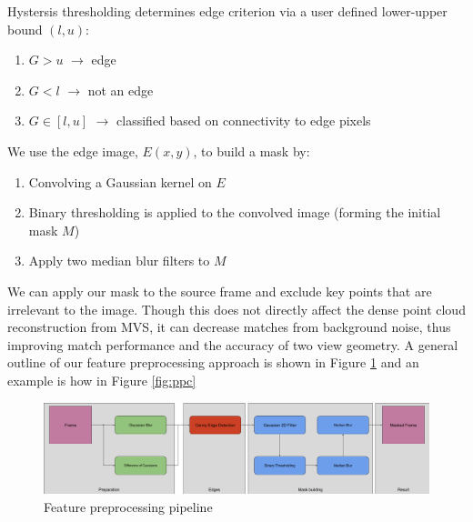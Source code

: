 \documentclass[conference,compsoc]{IEEEtran}
\begin{document}
Hystersis thresholding determines edge criterion via a user defined 
lower-upper bound $(l,u)$:
\begin{enumerate}[i]
    \item $G > u$ $\to$ edge
    \item $G < l$ $\to$ not an edge
    \item $G \in [l,u]$ $\to$ classified based on connectivity to edge pixels
\end{enumerate}
We use the edge image, $E(x,y)$, to build a mask by:
\begin{enumerate}[1.]
    \item Convolving a Gaussian kernel on $E$
    \item Binary thresholding is applied to the convolved image (forming the initial mask $M$)
    \item Apply two median blur filters to $M$
\end{enumerate}
We can apply our mask to the source frame and exclude key points that
are irrelevant to the image. Though this does not directly affect the dense point cloud
reconstruction from MVS, it can decrease matches from background noise, thus 
improving match performance and the accuracy of two view geometry. A general 
outline of our feature preprocessing approach is shown in Figure \ref{fig:ppc_pipe}
and an example is how in Figure \ref{fig:ppc}
\begin{figure}[ht!]
    \centering
    \includegraphics[width=.4\textwidth]{figures/preproc pipeline.png}
    \caption{Feature preprocessing pipeline}
    \label{fig:ppc_pipe}
\end{figure}
\end{document}
